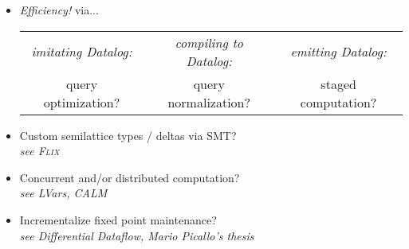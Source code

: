 \documentclass[aspectratio=169,dvipsnames]{beamer}
\newcommand\standout{\color{standout}}
\newcommand\ensuretext[1]{\ifmmode\text{#1}\else{#1}\fi}
\newcommand\todocolor{\color{OrangeRed}}
\newcommand\todo[1]{{\todocolor\ensuretext{\bfseries\sffamily[{#1}]}}}
\begin{document}

  \begin{frame}%
    \centering

    \begin{itemize}
      \setlength\itemsep{2ex}
    \item \emph{Efficiency!} via... %

      \begin{center}
        \large
        \begin{tabular}{ccc}
          \emph{\normalsize imitating Datalog:}
          &
          \emph{\normalsize compiling to Datalog:}
          &
          \emph{\normalsize emitting Datalog:}
          \\
          query optimization?
          & query normalization?
          & staged computation?
        \end{tabular}
      \end{center}

    \item Custom semilattice types / deltas via SMT?
      \\
      {\large\itshape see {\upshape\scshape Flix}}

    \item Concurrent and/or distributed computation?
      \\
      {\large\itshape see LVars, CALM}

      \item Incrementalize fixed point maintenance?
        \\
        {\large\itshape see Differential Dataflow, Mario Picallo's thesis}
    \end{itemize}

  \end{frame}
\end{document}
